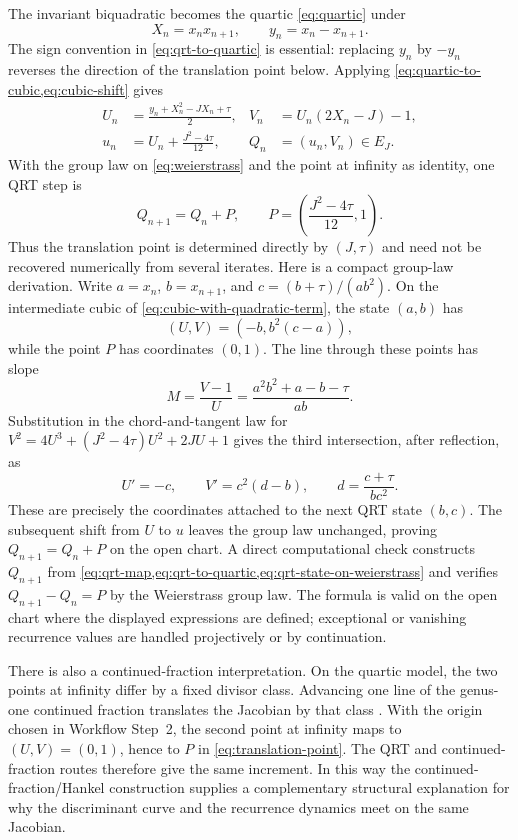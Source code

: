 \documentclass[11pt]{article}
\newcommand{\taupar}{\tau}
\begin{document}
The invariant biquadratic becomes the quartic \cref{eq:quartic} under
\begin{equation}
  X_n=x_nx_{n+1},
  \qquad
  y_n=x_n-x_{n+1}.
  \label{eq:qrt-to-quartic}
\end{equation}
The sign convention in \cref{eq:qrt-to-quartic} is essential: replacing
$y_n$ by $-y_n$ reverses the direction of the translation point below.
Applying \cref{eq:quartic-to-cubic,eq:cubic-shift} gives
\begin{align}
  U_n&=\frac{y_n+X_n^2-JX_n+\taupar}{2},
  &V_n&=U_n(2X_n-J)-1,\nonumber\\
  u_n&=U_n+\frac{J^2-4\taupar}{12},
  &Q_n&=(u_n,V_n)\in E_J.
  \label{eq:qrt-state-on-weierstrass}
\end{align}
With the group law on \cref{eq:weierstrass} and the point at infinity as
identity, one QRT step is
\begin{equation}
  Q_{n+1}=Q_n+P,
  \qquad
  P=\left(\frac{J^2-4\taupar}{12},1\right).
  \label{eq:translation-point}
\end{equation}
Thus the translation point is determined directly by $(J,\taupar)$ and need
not be recovered numerically from several iterates. Here is a compact group-law
derivation. Write $a=x_n$, $b=x_{n+1}$, and
$c=(b+\taupar)/(ab^2)$. On the intermediate cubic of
\cref{eq:cubic-with-quadratic-term}, the state $(a,b)$ has
\[
  (U,V)=(-b,b^2(c-a)),
\]
while the point $P$ has coordinates $(0,1)$. The line through these points has
slope
\[
  M=\frac{V-1}{U}
   =\frac{a^2b^2+a-b-\taupar}{ab}.
\]
Substitution in the chord-and-tangent law for
$V^2=4U^3+(J^2-4\taupar)U^2+2JU+1$ gives the third intersection, after
reflection, as
\[
  U'=-c,\qquad V'=c^2(d-b),
  \qquad d=\frac{c+\taupar}{bc^2}.
\]
These are precisely the coordinates attached to the next QRT state $(b,c)$.
The subsequent shift from $U$ to $u$ leaves the group law unchanged, proving
$Q_{n+1}=Q_n+P$ on the open chart. A direct computational check constructs
$Q_{n+1}$ from
\cref{eq:qrt-map,eq:qrt-to-quartic,eq:qrt-state-on-weierstrass} and verifies
$Q_{n+1}-Q_n=P$ by the Weierstrass group law. The formula is valid on the open
chart where the displayed expressions are defined; exceptional or vanishing
recurrence values are handled projectively or by continuation.

There is also a continued-fraction interpretation. On the quartic model, the
two points at infinity differ by a fixed divisor class. Advancing one line of
the genus-one continued fraction translates the Jacobian by that class
\cite{Hone2020}. With the origin chosen in Workflow Step~2, the second point at
infinity maps to $(U,V)=(0,1)$, hence to $P$ in
\cref{eq:translation-point}. The QRT and continued-fraction routes therefore give the same increment. In
this way the continued-fraction/Hankel construction supplies a complementary
structural explanation for why the discriminant curve and the recurrence
dynamics meet on the same Jacobian.
\end{document}

